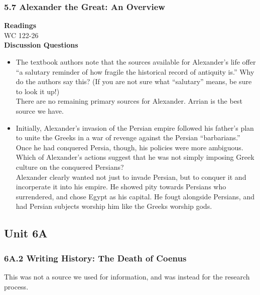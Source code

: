 \documentclass{article}
\begin{document}
\subsubsection*{5.7 Alexander the Great: An Overview}
\textbf{Readings} \\
WC 122-26 \\
\textbf{Discussion Questions}
\begin{itemize}
  \item The textbook authors note that the sources available for Alexander’s life offer “a
  salutary reminder of how fragile the historical record of antiquity is.” Why do the authors
  say this? (If you are not sure what “salutary” means, be sure to look it up!) \\
  There are no remaining primary sources for Alexander. Arrian is the best source we have.
  \item Initially, Alexander’s invasion of the Persian empire followed his father’s plan to
  unite the Greeks in a war of revenge against the Persian “barbarians.” Once he had
  conquered Persia, though, his policies were more ambiguous. Which of Alexander’s
  actions suggest that he was not simply imposing Greek culture on the conquered
  Persians? \\
  Alexander clearly wanted not just to invade Persian, but to conquer it and incorperate it
  into his empire. He showed pity towards Persians who surrendered, and chose Egypt as
  his capital. He fougt alongside Persians, and had Persian subjects worship him like the
  Greeks worship gods.
\end{itemize}
\subsection*{Unit 6A}
\subsubsection*{6A.2 Writing History: The Death of Coenus}
This was not a source we used for information, and was instead for the research process.
\end{document}
